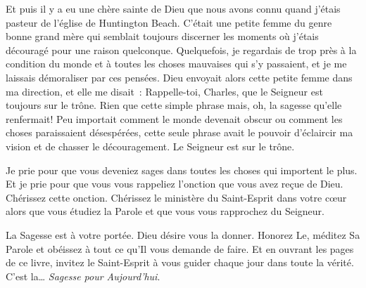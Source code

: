 Et puis il y a eu une chère sainte de Dieu que nous avons connu quand
 j'étais pasteur de l'église de Huntington Beach.
 C'était une petite femme du genre bonne grand mère qui semblait
 toujours discerner les moments où j'étais découragé
 pour une raison quelconque. Quelquefois, je regardais de trop près à la
 condition du monde et à toutes les choses mauvaises qui s'y passaient,
 et je me laissais démoraliser par ces pensées.
 Dieu envoyait alors cette petite femme dans ma direction,
 et elle me disait~: \og Rappelle-toi, Charles, que le Seigneur est toujours
 sur le trône. \fg{}
 Rien que cette simple phrase mais, oh, la sagesse qu'elle renfermait!
 Peu importait comment le monde devenait obscur ou comment les choses
 paraissaient désespérées, cette seule phrase avait le pouvoir d'éclaircir
 ma vision et de chasser le découragement.
 \og Le Seigneur est sur le trône. \fg{}

Je prie pour que vous deveniez sages dans toutes les choses qui importent
 le plus. Et je prie pour que vous vous rappeliez l'onction que vous avez
 reçue de Dieu. Chérissez cette onction. Chérissez le ministère du
 Saint-Esprit dans votre c\oe{}ur alors que vous étudiez la Parole
 et que vous vous rapprochez du Seigneur.

La Sagesse est à votre portée. Dieu désire vous la donner. Honorez Le,
 méditez Sa Parole et obéissez à tout ce qu'Il vous demande de faire.
 Et en ouvrant les pages de ce livre, invitez le Saint-Esprit à vous guider
 chaque jour dans toute la vérité.
 C'est la\dots{} \emph{Sagesse pour Aujourd'hui}.

\signature{Chuck Smith}

